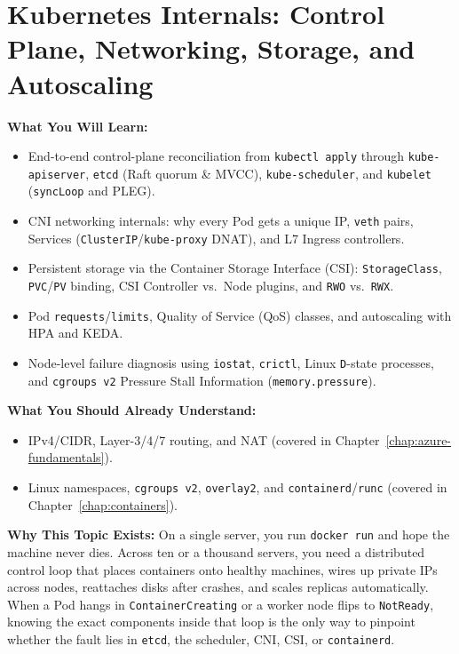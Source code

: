 \chapter{Kubernetes Internals: Control Plane, Networking, Storage, and Autoscaling}
\label{chap:kubernetes}

\begin{chaptergoalsbox}
\textbf{What You Will Learn:}
\begin{itemize}[leftmargin=12pt]
  \item End-to-end control-plane reconciliation from \texttt{kubectl apply} through \texttt{kube-apiserver}, \texttt{etcd} (Raft quorum \& MVCC), \texttt{kube-scheduler}, and \texttt{kubelet} (\texttt{syncLoop} and PLEG).
  \item CNI networking internals: why every Pod gets a unique IP, \texttt{veth} pairs, Services (\texttt{ClusterIP}/\texttt{kube-proxy} DNAT), and L7 Ingress controllers.
  \item Persistent storage via the Container Storage Interface (CSI): \texttt{StorageClass}, \texttt{PVC}/\texttt{PV} binding, CSI Controller vs.\ Node plugins, and \texttt{RWO} vs.\ \texttt{RWX}.
  \item Pod \texttt{requests}/\texttt{limits}, Quality of Service (QoS) classes, and autoscaling with HPA and KEDA.
  \item Node-level failure diagnosis using \texttt{iostat}, \texttt{crictl}, Linux \texttt{D}-state processes, and \texttt{cgroups v2} Pressure Stall Information (\texttt{memory.pressure}).
\end{itemize}

\textbf{What You Should Already Understand:}
\begin{itemize}[leftmargin=12pt]
  \item IPv4/CIDR, Layer-3/4/7 routing, and NAT (covered in Chapter~\ref{chap:azure-fundamentals}).
  \item Linux namespaces, \texttt{cgroups v2}, \texttt{overlay2}, and \texttt{containerd}/\texttt{runc} (covered in Chapter~\ref{chap:containers}).
\end{itemize}

\textbf{Why This Topic Exists:}
On a single server, you run \texttt{docker run} and hope the machine never dies. Across ten or a thousand servers, you need a distributed control loop that places containers onto healthy machines, wires up private IPs across nodes, reattaches disks after crashes, and scales replicas automatically. When a Pod hangs in \texttt{ContainerCreating} or a worker node flips to \texttt{NotReady}, knowing the exact components inside that loop is the only way to pinpoint whether the fault lies in \texttt{etcd}, the scheduler, CNI, CSI, or \texttt{containerd}.


\end{chaptergoalsbox}
